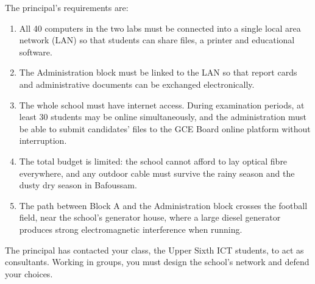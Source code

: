 \documentclass[11pt]{article}
\newcommand{\cle}[1]{{\popxbold\color{popdark}#1}}
\newcounter{popsec}
\newcounter{popsub}
\newcommand{\courssub}[1]{%
  \stepcounter{popsub}%
  \par\vspace{9pt}\noindent{\popxbold\fontsize{11.5}{13}\selectfont\color{popink}{\color{poporange}\thepopsec.\thepopsub}\hspace{6pt}#1}\par\nopagebreak\vspace{4pt}
}
\begin{document}
The principal's requirements are:

\begin{enumerate}
\item All 40 computers in the two labs must be connected into a single \cle{local area network} (LAN) so that students can share files, a printer and educational software.
\item The Administration block must be linked to the LAN so that report cards and administrative documents can be exchanged electronically.
\item The whole school must have internet access. During examination periods, at least 30 students may be online simultaneously, and the administration must be able to submit candidates' files to the GCE Board online platform without interruption.
\item The total budget is limited: the school cannot afford to lay optical fibre everywhere, and any outdoor cable must survive the rainy season and the dusty dry season in Bafoussam.
\item The path between Block A and the Administration block crosses the football field, near the school's generator house, where a large diesel generator produces strong electromagnetic interference when running.
\end{enumerate}

The principal has contacted your class, the Upper Sixth ICT students, to act as consultants. Working in groups, you must design the school's network and defend your choices.

\courssub{Tasks}
\end{document}
